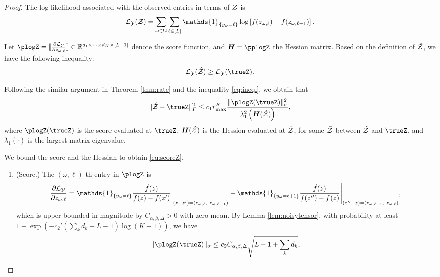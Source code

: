 \documentclass{article}
\theoremstyle{plain}
\theoremstyle{definition}
\begin{document}
\begin{proof} 
The log-likelihood associated with the observed entries in terms of $\mathcal{Z}$ is
\begin{equation}\label{eq:loglz}
\flogl(\tZ) = \sum_{\omega\in\Omega}\sum_{\ell\in[L]}\mathds{1}_{\{y_\omega=\ell\}}\log\left[f(z_{\omega,\ell})-f(z_{\omega,\ell-1})\right].
\end{equation}

Let $\plogZ=\entry{{\partial \tL_\tY\over \partial z_{\omega,\ell}}}\in\mathbb{R}^{d_1\times \cdots \times d_K\times[L-1]}$ denote the score function, and $\mH=\pplogZ$ the Hession matrix. 
Based on the definition of $\hat{\mathcal{Z}}$, we have the following inequality:
\begin{equation}\label{eq:ineql}
\flogl(\hat\tZ) \geq \flogl(\trueZ).
\end{equation}

Following the similar argument in Theorem \ref{thm:rate} and the inequality \eqref{eq:ineql}, we obtain that
\begin{equation}\label{eq:boundZ}
\FnormSize{}{\hat \tZ-\trueZ}^2 \leq c_1r^{K}_{\max}{\snormSize{}{\plogZ(\trueZ)}^2\over \lambda^2_{1} \left(\mH(\check\tZ)\right)},
\end{equation}
where $\plogZ(\trueZ)$ is the score evaluated at $\trueZ$, $\bm{H}(\check {\mathcal{Z}})$ is the Hession evaluated at $\check{\mathcal{Z}}$, for some $\check{\mathcal{Z}}$ between $\hat {\mathcal{Z}}$ and $\trueZ$,  and $\lambda_{1}(\cdot)$ is the largest matrix eigenvalue. 

We bound the score and the Hessian to obtain \eqref{eq:scoreZ}.

\begin{enumerate}
\item (Score.) The $(\omega,\ell)$-th entry in $\plogZ$ is 
\[
{\partial \tL_\tY\over \partial z_{\omega,\ell}}=\mathds{1}_{\{y_\omega=\ell\}}{\dot{f}(z)\over f(z)-f(z')}\Bigg|_{(z,\ z')=(z_{\omega,\ell},\ z_{\omega,\ell-1})} - \mathds{1}_{\{y_\omega=\ell+1\}}{\dot{f}(z)\over f(z'')-f(z)}\Bigg|_{(z'',\ z)=(z_{\omega,\ell+1},\ z_{\omega,\ell})},
\]
which is upper bounded in magnitude by $C_{\alpha,\beta,\Delta}>0$ with zero mean. By Lemma \ref{lem:noisytensor}, with probability at least $1-\exp\left(-c_2'
\left(\sum_k d_k+ L-1\right)\log(K+1)\right)$, we have
\begin{align}\label{eq:scorebound}
\snormSize{}{\plogZ(\trueZ)}\leq c_2C_{\alpha,\beta,\Delta}\sqrt{L-1+\sum_k d_k},
\end{align}


\end{enumerate}
\end{proof}
\end{document}
